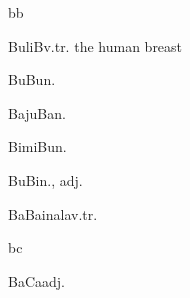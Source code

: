 \begin{multicols*}{2}
\begin{dictroot}{b}{b}
\begin{dictentry}{BuliB}{v.tr.}
{            the human breast
        }
    \end{dictentry}
    \begin{dictentry}{BuBu}{n.}
    \end{dictentry}
    \begin{dictentry}{BajuBa}{n.}
    \end{dictentry}
    \begin{dictentry}{BimiBu}{n.}
    \end{dictentry}
    \begin{dictentry}{BuBi}{n., adj.}
    \end{dictentry}
    \begin{dictentry}{BaBainala}{v.tr.}
    \end{dictentry}
\end{dictroot}

\begin{dictroot}{b}{c}
    \begin{dictentry}{BaCa}{adj.}
    \end{dictentry}
\end{dictroot}


\end{multicols*}
